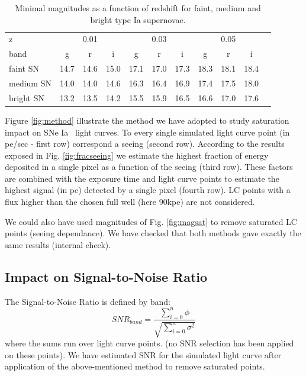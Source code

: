 \documentclass[\docopts]{\docclass}
\newcommand{\sne}{{SNe Ia }}
\begin{document}
\begin{table}[!htbp]
  \caption{Minimal magnitudes as a function of redshift for faint, medium and bright type Ia supernovae.}\label{tab:minimag}
  \begin{center}
    \begin{tabular}{l|ccc|ccc|cccc}
      \hline
      \hline
      z        &\multicolumn{3}{c}{0.01} & \multicolumn{3}{c}{0.03} & \multicolumn{3}{c}{0.05} \\
      band & g & r & i & g & r & i & g & r &i \\
      \hline
      \hline
      faint SN   & 14.7 & 14.6 & 15.0 & 17.1 & 17.0 & 17.3 & 18.3 & 18.1 & 18.4 \\
      medium SN  & 14.0 & 14.0 & 14.6 & 16.3 & 16.4 & 16.9 & 17.4 & 17.5 & 18.0 \\
      bright SN & 13.2 & 13.5 & 14.2 & 15.5 & 15.9 & 16.5 & 16.6 & 17.0 & 17.6\\
      \hline
    \end{tabular}
  \end{center}
  \end{table}

Figure \ref{fig:method} illustrate the method we have adopted to study saturation impact on \sne~light curves. To every single simulated light curve point (in pe/sec - first row) correspond a seeing (second row). According to the results exposed in Fig. \ref{fig:fracseeing} we estimate the highest fraction of energy deposited in a single pixel as a function of the seeing (third row). These factors are combined with the exposure time and  light curve points to estimate the highest signal (in pe) detected by a single pixel (fourth row). LC points with a flux higher than the chosen full well (here 90kpe) are not considered.\par
We could also have used  magnitudes of Fig. \ref{fig:magsat} to remove saturated LC points (seeing dependance). We have checked that both methods gave exactly the same results (internal check). 

\subsection{Impact on Signal-to-Noise Ratio}
The Signal-to-Noise Ratio is defined by band:
\begin{equation}
 SNR_{band} = \frac{\displaystyle \sum_{i=0}^{n}  \phi}{\sqrt{\displaystyle \sum_{i=0}^{n}  \sigma^2}}
\end{equation}
where the sums run over light curve points. (no SNR selection has been applied on these points). We have estimated SNR for the simulated light curve after application of the above-mentioned method to remove saturated points. 
\end{document}

